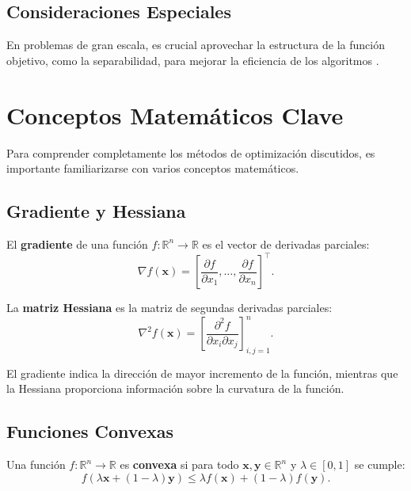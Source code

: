 \subsection{Consideraciones Especiales}

En problemas de gran escala, es crucial aprovechar la estructura de la función objetivo, como la separabilidad, para mejorar la eficiencia de los algoritmos \cite{bertsekas1997nonlinear}.

\section{Conceptos Matemáticos Clave}

Para comprender completamente los métodos de optimización discutidos, es importante familiarizarse con varios conceptos matemáticos.

\subsection{Gradiente y Hessiana}

\begin{definicion}
El \textbf{gradiente} de una función $f: \mathbb{R}^n \rightarrow \mathbb{R}$ es el vector de derivadas parciales:
\begin{equation}
\nabla f(\mathbf{x}) = \left[ \frac{\partial f}{\partial x_1}, \dots, \frac{\partial f}{\partial x_n} \right]^\top.
\end{equation}
\end{definicion}

\begin{definicion}
La \textbf{matriz Hessiana} es la matriz de segundas derivadas parciales:
\begin{equation}
\nabla^2 f(\mathbf{x}) = \left[ \frac{\partial^2 f}{\partial x_i \partial x_j} \right]_{i,j=1}^n.
\end{equation}
\end{definicion}

El gradiente indica la dirección de mayor incremento de la función, mientras que la Hessiana proporciona información sobre la curvatura de la función.

\subsection{Funciones Convexas}

\begin{definicion}
Una función $f: \mathbb{R}^n \rightarrow \mathbb{R}$ es \textbf{convexa} si para todo $\mathbf{x}, \mathbf{y} \in \mathbb{R}^n$ y $\lambda \in [0,1]$ se cumple:
\begin{equation}
f(\lambda \mathbf{x} + (1 - \lambda) \mathbf{y}) \leq \lambda f(\mathbf{x}) + (1 - \lambda) f(\mathbf{y}).
\end{equation}
\end{definicion}

